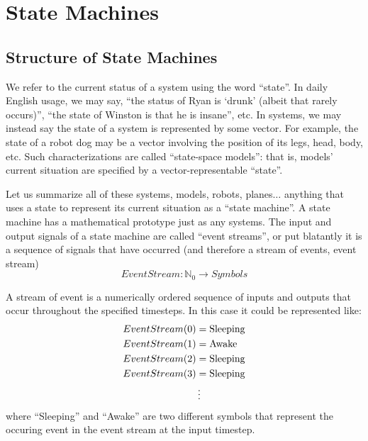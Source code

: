 \chapter{State Machines}

\section{Structure of State Machines}
We refer to the current status of a system using the word ``state''.
In daily English usage, we may say, ``the status of Ryan is `drunk' (albeit that rarely occurs)'', ``the state of Winston is that he is insane'', etc.
In systems, we may instead say the state of a system is represented by some vector. For example, the state of a robot dog may be a vector involving the position of its legs, head, body, etc.
Such characterizations are called ``state-space models'': that is, models' current situation are specified by a vector-representable ``state''.

Let us summarize all of these systems, models, robots, planes$\dots$ anything that uses a state to represent its current situation as a ``state machine''.
A state machine has a mathematical prototype just as any systems.
The input and output signals of a state machine are called ``event streams'', or put blatantly it is a sequence of signals that have occurred (and therefore a stream of events, event stream)
\[
    {EventStream}: \mathbb{N}_0 \rightarrow Symbols
\]

A stream of event is a numerically ordered sequence of inputs and outputs that occur throughout the specified timesteps. In this case it could be represented like:
\begin{align*}
    EventStream(0) &= {\rm Sleeping} \\
    EventStream(1) &= {\rm Awake} \\
    EventStream(2) &= {\rm Sleeping} \\
    EventStream(3) &= {\rm Sleeping} \\
    &\vdots
\end{align*}
where ``Sleeping'' and ``Awake'' are two different symbols that represent the occuring event in the event stream at the input timestep.

